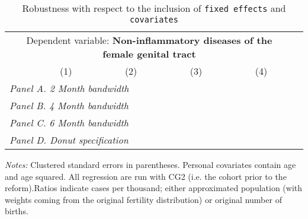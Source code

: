 \begin{table}[H] \begin{threeparttable} \centering \caption{Robustness with respect to the inclusion of \texttt{fixed effects} and \texttt{covariates}} {\def\sym#1{\ifmmode^{#1}\else\(^{#1}\)\fi} \begin{tabular}{l*{5}{c}} \toprule \multicolumn{5}{c}{Dependent variable: \textbf{Non-inflammatory diseases of the female genital tract}} \\ \cmidrule(lr){2-5}
            &\multicolumn{1}{c}{(1)}&\multicolumn{1}{c}{(2)}&\multicolumn{1}{c}{(3)}&\multicolumn{1}{c}{(4)}\\
\midrule
 \multicolumn{5}{l}{\emph{Panel A. 2 Month bandwidth}} \\    \midrule\multicolumn{5}{l}{\emph{Panel B. 4 Month bandwidth}} \\    \midrule\multicolumn{5}{l}{\emph{Panel C. 6 Month bandwidth}} \\    \midrule\multicolumn{5}{l}{\emph{Panel D. Donut specification}} \\    \midrule  
\bottomrule \end{tabular} } \begin{tablenotes} \item \scriptsize \emph{Notes:} Clustered standard errors in parentheses. Personal covariates contain age and age squared. All regression are run with CG2 (i.e. the cohort prior to the reform).Ratios indicate cases per thousand; either approximated population (with weights coming from the original fertility distribution) or original number of births. \end{tablenotes} \end{threeparttable} \end{table} 
